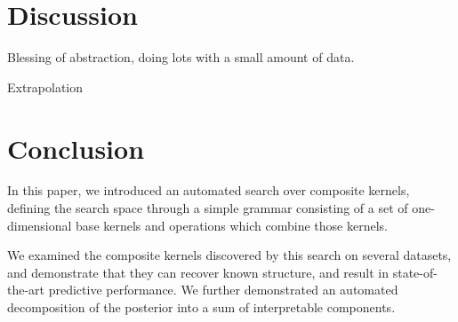 \documentclass[twoside]{article}
\begin{document}
\section{Discussion}

Blessing of abstraction, doing lots with a small amount of data.

Extrapolation

\section{Conclusion}

In this paper, we introduced an automated search over composite kernels, defining the search space through a simple grammar consisting of a set of one-dimensional base kernels and operations which combine those kernels.

We examined the composite kernels discovered by this search on several datasets, and demonstrate that they can recover known structure, and result in state-of-the-art predictive performance.  We further demonstrated an automated decomposition of the posterior into a sum of interpretable components.






\end{document}
